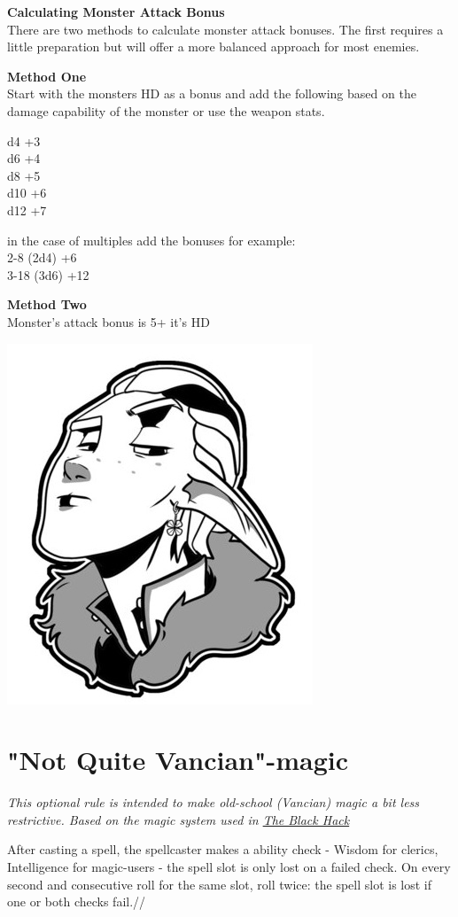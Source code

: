 \documentclass[letterpaper,sansserif,tightsqueeze]{rpg-module}
\begin{document}
\textbf{Calculating Monster Attack Bonus}\\
There are two methods to calculate monster attack bonuses. The first requires a little preparation but will offer a more balanced approach for most enemies.

\textbf{Method One}\\
Start with the monsters HD as a bonus and add the following based on the damage capability of the monster or use the weapon stats.

d4 +3\\
d6 +4\\
d8 +5\\
d10 +6\\
d12 +7

in the case of multiples add the bonuses for example:\\
2-8 (2d4) +6\\
3-18 (3d6) +12

\textbf{Method Two}\\
Monster’s attack bonus is 5+ it’s HD

\vspace{0.5cm}

\begin{center}
	\includegraphics[width = 0.3\linewidth]{shame_elf.jpg}
\end{center}
\section{"Not Quite Vancian"-magic}
\textit{This optional rule is intended to make old-school (Vancian) magic a bit less restrictive. Based on the magic system used in \href{https://www.drivethrurpg.com/product/255088/The-Black-Hack-Second-Edition}{The Black Hack}}

After casting a spell, the spellcaster makes a ability check - Wisdom for clerics, Intelligence for magic-users - the spell slot is only lost on a failed check. On every second and consecutive roll for the same slot, roll twice: the spell slot is lost if one or both checks fail.//
\end{document}
